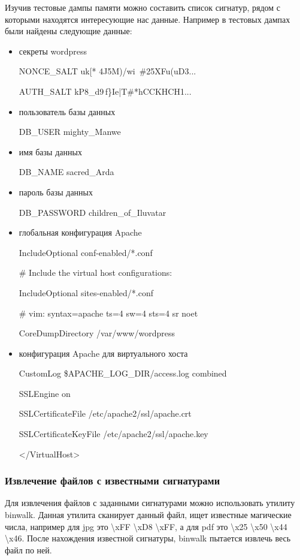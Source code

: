 \documentclass[20pt]{article}
\begin{document}
Изучив тестовые дампы памяти можно составить список сигнатур, рядом с которыми
находятся интересующие нас данные. Например в тестовых дампах были найдены следующие
данные:

\begin{itemize}
  \item секреты wordpress

  NONCE\_SALT uk[* 4J5M)/wi~\#25XFu(uD3...

  AUTH\_SALT kP8\_d9\,f\}Ie|T\#*hCCKHCH1...

  \item пользователь базы данных

  DB\_USER mighty\_Manwe

  \item имя базы данных

  DB\_NAME sacred\_Arda

  \item пароль базы данных

  DB\_PASSWORD children\_of\_Iluvatar

  \item глобальная конфигурация Apache

  IncludeOptional conf-enabled/*.conf

  \# Include the virtual host configurations:

  IncludeOptional sites-enabled/*.conf

  \# vim: syntax=apache ts=4 sw=4 sts=4 sr noet

  CoreDumpDirectory /var/www/wordpress

  \item конфигурация Apache для виртуального хоста

  CustomLog \${APACHE\_LOG\_DIR}/access.log combined

  SSLEngine on

  SSLCertificateFile /etc/apache2/ssl/apache.crt

  SSLCertificateKeyFile /etc/apache2/ssl/apache.key

  </VirtualHost>

\end{itemize}

\subsubsection{Извлечение файлов с известными сигнатурами}

Для извлечения файлов с заданными сигнатурами можно использовать утилиту
binwalk\cite{binwalk}. Данная утилита сканирует данный файл, ищет известные
магические числа\cite{signatures}, например для jpg это \textbackslash xFF
\textbackslash xD8 \textbackslash xFF, а для pdf это \textbackslash x25
\textbackslash x50 \textbackslash x44 \textbackslash x46. После нахождения
известной сигнатуры, binwalk пытается извлечь весь файл по ней.
\end{document}
